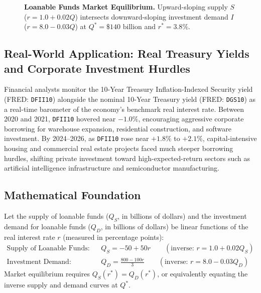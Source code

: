 \documentclass[11pt,letterpaper]{article}
\begin{document}
\begin{figure}[h!]
  \caption{\textbf{Loanable Funds Market Equilibrium.} Upward-sloping supply $S$ ($r = 1.0 + 0.02Q$) intersects downward-sloping investment demand $I$ ($r = 8.0 - 0.03Q$) at $Q^* = \$140\text{ billion}$ and $r^* = 3.8\%$.}
  \label{fig:ch7-loanable-funds}
\end{figure}

\subsection*{Real-World Application: Real Treasury Yields and Corporate Investment Hurdles}
Financial analysts monitor the 10-Year Treasury Inflation-Indexed Security yield (FRED: \texttt{DFII10}) alongside the nominal 10-Year Treasury yield (FRED: \texttt{DGS10}) as a real-time barometer of the economy's benchmark real interest rate. Between 2020 and 2021, \texttt{DFII10} hovered near $-1.0\%$, encouraging aggressive corporate borrowing for warehouse expansion, residential construction, and software investment. By 2024--2026, as \texttt{DFII10} rose near $+1.8\%$ to $+2.1\%$, capital-intensive housing and commercial real estate projects faced much steeper borrowing hurdles, shifting private investment toward high-expected-return sectors such as artificial intelligence infrastructure and semiconductor manufacturing.

\subsection*{Mathematical Foundation}
Let the supply of loanable funds ($Q_S$, in billions of dollars) and the investment demand for loanable funds ($Q_D$, in billions of dollars) be linear functions of the real interest rate $r$ (measured in percentage points):
\begin{align}
\text{Supply of Loanable Funds:} \quad & Q_S = -50 + 50r \qquad \left(\text{inverse: } r = 1.0 + 0.02Q_S\right) \\
\text{Investment Demand:} \quad & Q_D = \frac{800 - 100r}{3} \qquad \left(\text{inverse: } r = 8.0 - 0.03Q_D\right)
\end{align}
Market equilibrium requires $Q_S(r^*) = Q_D(r^*)$, or equivalently equating the inverse supply and demand curves at $Q^*$.
\end{document}

